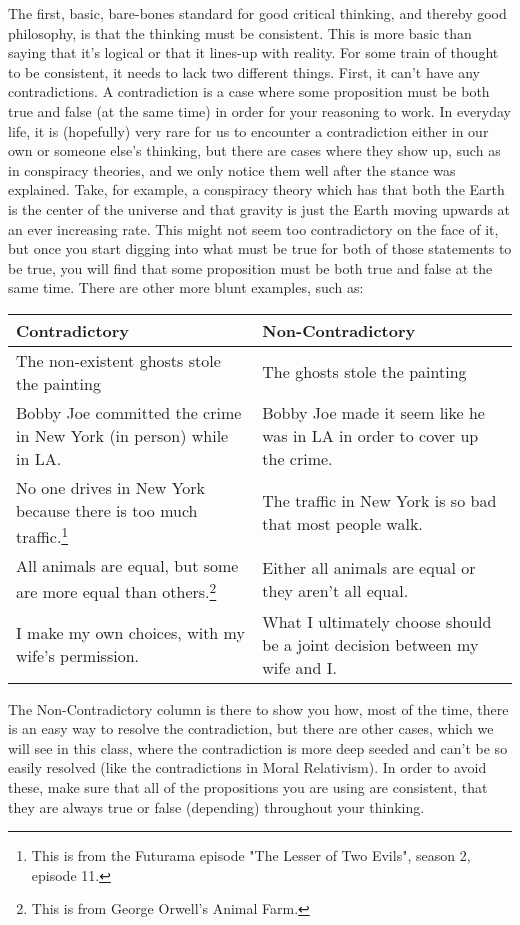 The first, basic, bare-bones standard for good critical thinking, and thereby good philosophy, is that the thinking must be consistent. This is more basic than saying that it's logical or that it lines-up with reality. For some train of thought to be consistent, it needs to lack two different things. First, it can't have any contradictions. A contradiction is a case where some proposition must be both true and false (at the same time) in order for your reasoning to work. In everyday life, it is (hopefully) very rare for us to encounter a contradiction either in our own or someone else's thinking, but there are cases where they show up, such as in conspiracy theories, and we only notice them well after the stance was explained. Take, for example, a conspiracy theory which has that both the Earth is the center of the universe and that gravity is just the Earth moving upwards at an ever increasing rate. This might not seem too contradictory on the face of it, but once you start digging into what must be true for both of those statements to be true, you will find that some proposition must be both true and false at the same time. There are other more blunt examples, such as:

\begin{tabular}{p{2.5in}|p{2.5in}}
Contradictory &Non-Contradictory\\\hline
The non-existent ghosts stole the painting &The ghosts stole the painting\\\hline
Bobby Joe committed the crime in New York (in person) while in LA. &Bobby Joe made it seem like he was in LA in order to cover up the crime.\\\hline
No one drives in New York because there is too much traffic.\footnote{This is from the Futurama episode "The Lesser of Two Evils", season 2, episode 11.} &The traffic in New York is so bad that most people walk.\\\hline
All animals are equal, but some are more equal than others.\footnote{This is from George Orwell's Animal Farm.} &Either all animals are equal or they aren't all equal.\\\hline
I make my own choices, with my wife's permission. &What I ultimately choose should be a joint decision between my wife and I.\\\hline
\end{tabular}

The Non-Contradictory column is there to show you how, most of the time, there is an easy way to resolve the contradiction, but there are other cases, which we will see in this class, where the contradiction is more deep seeded and can't be so easily resolved (like the contradictions in Moral Relativism). In order to avoid these, make sure that all of the propositions you are using are consistent, that they are always true or false (depending) throughout your thinking.

